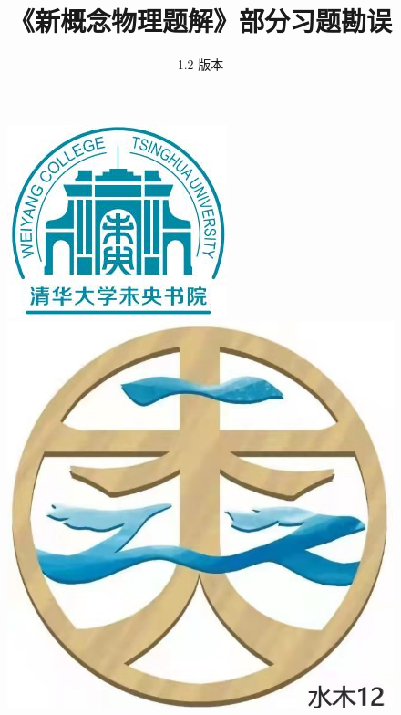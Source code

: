 \documentclass[a4paper,11pt]{ctexart}
\title{\Huge\textbf{《新概念物理题解》部分习题勘误}}
\author{1.2 版本}
\begin{document}
\maketitle

\begin{figure}[b]
    \centering
\begin{minipage}[t]{0.48\textwidth}
    \centering
    \includegraphics[scale=1.55]{wy.jpg}    
\end{minipage}
\begin{minipage}[t]{0.48\textwidth}
    \centering
    \includegraphics[scale=0.31]{无标题.jpg}    
\end{minipage}

\end{figure}

\end{document}
